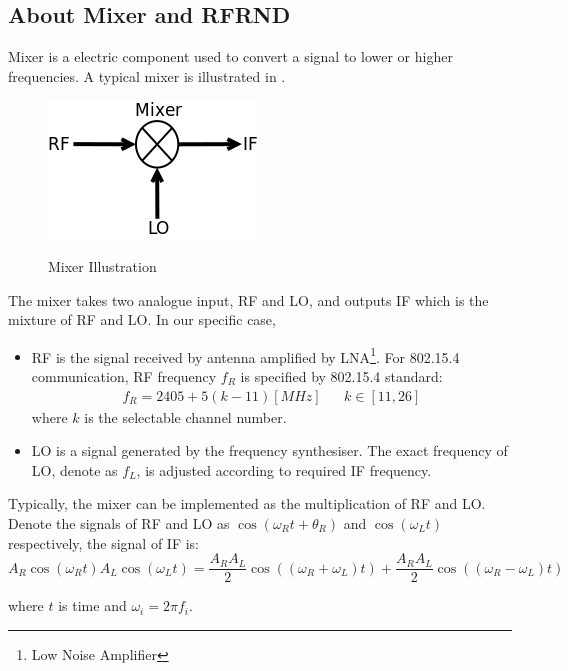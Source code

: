 \subsection{About Mixer and RFRND}

Mixer is a electric component used to convert a signal to lower or higher frequencies. A typical mixer is illustrated in .

\begin{figure}
\center
\caption{Mixer Illustration}
\includegraphics[width=0.5\linewidth]{figures/mixer.png}
\label{mixer}
\end{figure}

The mixer takes two analogue input, RF and LO, and outputs IF which is the mixture of RF and LO. In our specific case,
\begin{itemize}
\item RF is the signal received by antenna amplified by LNA\footnote{Low Noise Amplifier}. For 802.15.4 communication, RF frequency $f_{R}$ is specified by 802.15.4 standard\cite{802154_Standard}:
\begin{eqnarray}
f_{R} = 2405 + 5(k-11) [MHz] && k \in [11, 26]
\end{eqnarray}
where $k$ is the selectable channel number.

\item LO is a signal generated by the frequency synthesiser. The exact frequency of LO, denote as $f_{L}$, is adjusted according to required IF frequency.
\end{itemize}

Typically, the mixer can be implemented as the multiplication of RF and LO. Denote the signals of RF and LO as $\cos(\omega_{R}t + \theta_{R})$ and $\cos(\omega_{L}t)$ respectively, the signal of IF is:
\begin{equation} \label{IF}
A_{R}\cos(\omega_{R}t)A_{L}\cos(\omega_{L}t)  = {\frac{A_{R}A_{L}}{2}}\cos((\omega_{R} + \omega_{L})t) + {\frac{A_{R}A_{L}}{2}}\cos((\omega_{R} - \omega_{L})t)
\end{equation} 

where $t$ is time and $\omega_i = 2{\pi}f_i$.

